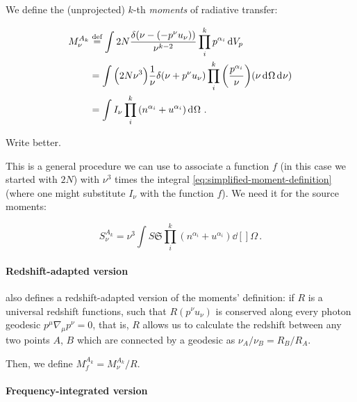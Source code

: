 \documentclass[main.tex]{subfiles}
\begin{document}
We define the (unprojected) \(k\)-th \emph{moments} of radiative transfer:

\begin{subequations}
\begin{align}
   M _\nu ^{A_k}
   &\defeq \int 2N \frac{\delta (\nu - (-p^\nu u_\nu))}{\nu^{k-2}} \prod_i^k p^{\alpha_i} \dd{V_p} \\
   &= \int \qty(2N \nu^3) \frac{1}{\nu} \delta (\nu +p^\nu u_\nu) \prod_i^k \qty(\frac{p^{\alpha_i}}{\nu}) \qty(\nu \dd[]{\Omega} \dd[]{\nu})  \\
   &= \int  I_\nu \prod_i^k \qty(n^{\alpha_i} + u^{\alpha_i}) \dd[]{\Omega}\,. \label{eq:simplified-moment-definition}
\end{align}
\end{subequations}

\begin{greenbox}
  Write better.
\end{greenbox}

This is a general procedure we can use to associate a function \(f\) (in this case we started with \(2N\)) with \(\nu^3\) times the integral \eqref{eq:simplified-moment-definition} (where one might substitute \(I _\nu\) with the function \(f\)).
We need it for the source moments:

\begin{equation}
   S_\nu ^{A_k} = \nu^3 \int S \mathfrak S \prod_i^k (n^{\alpha_i} + u^{\alpha_i}) \dd[]{\Omega} \,.
\end{equation}

\paragraph{Redshift-adapted version}

\textcite[]{Thorne:1981feb} also defines a redshift-adapted version of the moments' definition: if \(R\) is a universal redshift functions, such that \(R (p^\nu u_\nu)\) is conserved along every photon geodesic \(p^\mu \nabla_\mu p^\nu = 0\), that is, \(R\) allows us to calculate the redshift between any two points \(A\), \(B\) which are connected by a geodesic as \(\nu_A / \nu_B = R_B / R_A\).

Then, we define \( M_f ^{A_k} =  M_{\nu} ^{A_k} / R\).

\paragraph{Frequency-integrated version}
\end{document}
